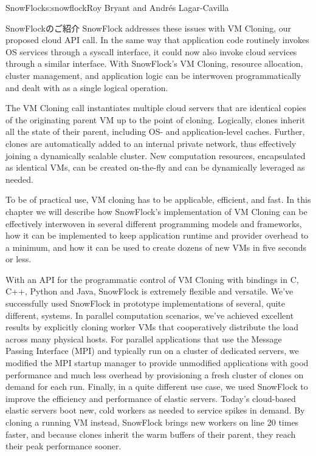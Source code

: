 \begin{aosachapter}{SnowFlock}{s:snowflock}{Roy Bryant and Andr\'e{s} Lagar-Cavilla}
\begin{aosasect1}{SnowFlockのご紹介}
SnowFlock addresses these issues with VM Cloning, our proposed cloud
API call. In the same way that application code routinely invokes OS
services through a syscall interface, it could now also invoke cloud
services through a similar interface. With SnowFlock's VM Cloning,
resource allocation, cluster management, and application logic can be
interwoven programmatically and dealt with as a single logical
operation.

The VM Cloning call instantiates multiple cloud servers that are
identical copies of the originating parent VM up to the point of
cloning. Logically, clones inherit all the state of their parent,
including OS- and application-level caches. Further, clones are
automatically added to an internal private network, thus effectively
joining a dynamically scalable cluster. New computation resources,
encapsulated as identical VMs, can be created on-the-fly and can be
dynamically leveraged as needed.

To be of practical use, VM cloning has to be applicable, efficient,
and fast. In this chapter we will describe how SnowFlock's
implementation of VM Cloning can be effectively interwoven in several
different programming models and frameworks, how it can be implemented
to keep application runtime and provider overhead to a minimum, and
how it can be used to create dozens of new VMs in five seconds or
less.

With an API for the programmatic control of VM Cloning with bindings
in C, C++, Python and Java, SnowFlock is extremely flexible and
versatile.  We've successfully used SnowFlock in prototype
implementations of several, quite different, systems.  In parallel
computation scenarios, we've achieved excellent results by explicitly
cloning worker VMs that cooperatively distribute the load across many
physical hosts. For parallel applications that use the Message Passing
Interface (MPI) and typically run on a cluster of dedicated servers,
we modified the MPI startup manager to provide unmodified applications
with good performance and much less overhead by provisioning a fresh
cluster of clones on demand for each run. Finally, in a quite
different use case, we used SnowFlock to improve the efficiency and
performance of elastic servers.  Today's cloud-based elastic servers
boot new, cold workers as needed to service spikes in demand. By
cloning a running VM instead, SnowFlock brings new workers on line 20
times faster, and because clones inherit the warm buffers of their
parent, they reach their peak performance sooner.


\end{aosasect1}
\end{aosachapter}

